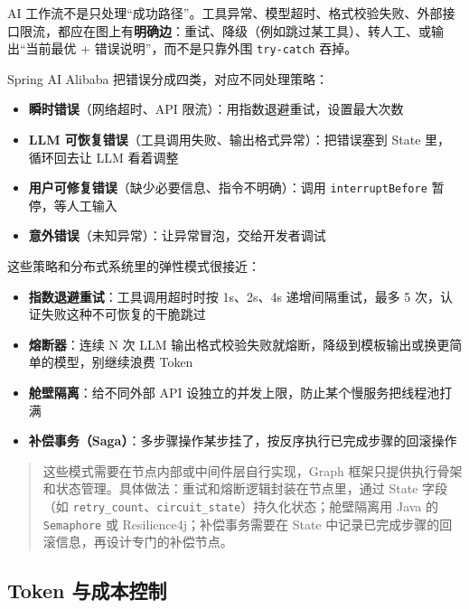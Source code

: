 \documentclass[10pt,a4paper]{ctexart}
\begin{document}
AI 工作流不是只处理“成功路径”。工具异常、模型超时、格式校验失败、外部接口限流，都应在图上有\textbf{明确边}：重试、降级（例如跳过某工具）、转人工、或输出“当前最优 + 错误说明”，而不是只靠外围 \texttt{try-catch} 吞掉。



Spring AI Alibaba 把错误分成四类，对应不同处理策略：


\begin{itemize}[itemsep=2pt, topsep=4pt]
  \item \textbf{瞬时错误}（网络超时、API 限流）：用指数退避重试，设置最大次数
  \item \textbf{LLM 可恢复错误}（工具调用失败、输出格式异常）：把错误塞到 State 里，循环回去让 LLM 看着调整
  \item \textbf{用户可修复错误}（缺少必要信息、指令不明确）：调用 \texttt{interruptBefore} 暂停，等人工输入
  \item \textbf{意外错误}（未知异常）：让异常冒泡，交给开发者调试
\end{itemize}


这些策略和分布式系统里的弹性模式很接近：


\begin{itemize}[itemsep=2pt, topsep=4pt]
  \item \textbf{指数退避重试}：工具调用超时时按 1s、2s、4s 递增间隔重试，最多 5 次，认证失败这种不可恢复的干脆跳过
  \item \textbf{熔断器}：连续 N 次 LLM 输出格式校验失败就熔断，降级到模板输出或换更简单的模型，别继续浪费 Token
  \item \textbf{舱壁隔离}：给不同外部 API 设独立的并发上限，防止某个慢服务把线程池打满
  \item \textbf{补偿事务（Saga）}：多步骤操作某步挂了，按反序执行已完成步骤的回滚操作
\end{itemize}


\begin{quote}
这些模式需要在节点内部或中间件层自行实现，Graph 框架只提供执行骨架和状态管理。具体做法：重试和熔断逻辑封装在节点里，通过 State 字段（如 \texttt{retry\_count}、\texttt{circuit\_state}）持久化状态；舱壁隔离用 Java 的 \texttt{Semaphore} 或 Resilience4j；补偿事务需要在 State 中记录已完成步骤的回滚信息，再设计专门的补偿节点。
\end{quote}



\subsection{Token 与成本控制}
\end{document}
